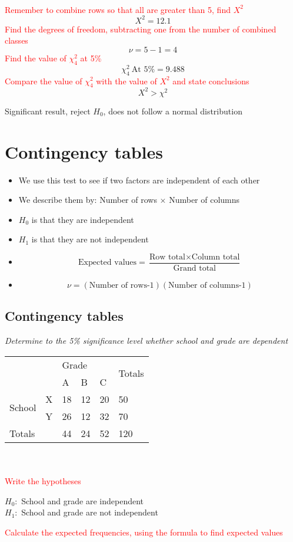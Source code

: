 \documentclass{article}[18pt]
\begin{document}
\\
\textcolor{red}{Remember to combine rows so that all are greater than 5, find $X^2$}
$$X^2=12.1$$
\textcolor{red}{Find the degrees of freedom, subtracting one from the number of combined classes}
$$\nu=5-1=4$$
\textcolor{red}{Find the value of $\chi^2_4$ at 5\%}
$$\chi^2_4 \ \textrm{At 5\%}=9.488$$
\textcolor{red}{Compare the value of $\chi^2_4$ with the value of $X^2$ and state conclusions}
$$X^2>\chi^2$$
\begin{center}
Significant result, reject $H_0$, does not follow a normal distribution
\end{center}
\newpage
\section{Contingency tables}
\begin{itemize}
\item We use this test to see if two factors are independent of each other
\item We describe them by: Number of rows $\times$ Number of columns
\item $H_0$ is that they are independent
\item $H_1$ is that they are not independent
\item $$\textrm{Expected values}=\frac{\textrm{Row total}\times\textrm{Column total}}{\textrm{Grand total}}$$
\item $$\nu=(\textrm{Number of rows-1})(\textrm{Number of columns-1})$$
\end{itemize}
\subsection{Contingency tables}
\textit{Determine to the 5\% significance level whether school and grade are dependent}\\

\begin{tabularx}{\textwidth}{|X|X|X|X|X|X|}
\hline
&&\multicolumn{3}{|X|}{Grade}&\multirow{2}{4em}{Totals}\\
\cline{3-5}
&&A&B&C&\\
\hline
\multirow{2}{4em}{School}&X&18&12&20&50\\
\cline{2-6}
&Y&26&12&32&70\\
\hline
Totals&&44&24&52&120\\
\hline
\end{tabularx}
\\
\\
\textcolor{red}{Write the hypotheses}
\begin{center}
$H_0:$ School and grade are independent\\
$H_1:$ School and grade are not independent\\
\end{center}
\textcolor{red}{Calculate the expected frequencies, using the formula to find expected values}\\
\end{document}
